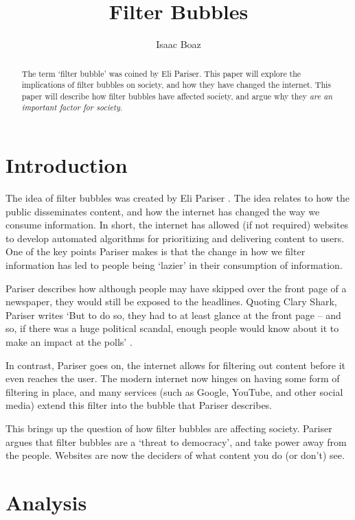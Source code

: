 \documentclass[12pt]{article}
\begin{document}
\title{Filter Bubbles}
\author{Isaac Boaz}
\maketitle

\begin{abstract}
    The term `filter bubble' was coined by Eli Pariser. This paper will explore
    the implications of filter bubbles on society, and how they have changed the
    internet. This paper will describe how filter bubbles have affected society,
    and argue why they \emph{are an important factor for society}.
\end{abstract}


\section{Introduction}
The idea of filter bubbles was created by Eli Pariser \cite{elifilter}. The idea
relates to how the public disseminates content, and how the internet has
changed the way we consume information. In short, the internet has allowed (if
not required) websites to develop automated algorithms for prioritizing and
delivering content to users. One of the key points Pariser makes is that
the change in how we filter information has led to people being `lazier' in
their consumption of information.

Pariser describes how although people may have skipped over the front page of a
newspaper, they would still be exposed to the headlines. Quoting Clary Shark,
Pariser writes `But to do so, they had to at least glance at the front page -- and
so, if there was a huge political scandal, enough people would know about it to
make an impact at the polls' \cite{elifilter}.

In contrast, Pariser goes on, the internet allows for filtering out content
before it even reaches the user. The modern internet now hinges on having some
form of filtering in place, and many services (such as Google, YouTube, and
other social media) extend this filter into the bubble that Pariser describes.

This brings up the question of how filter bubbles are affecting society.
Pariser argues that filter bubbles are a `threat to democracy', and take power
away from the people. Websites are now the deciders of what content you do (or
don't) see.

\section{Analysis}
\end{document}
